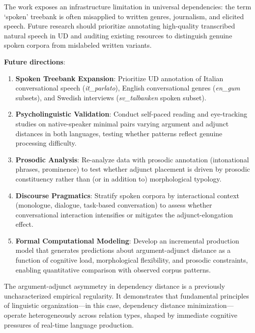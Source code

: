 \documentclass[11pt,letterpaper]{article}
\begin{document}
The work exposes an infrastructure limitation in universal dependencies: the term `spoken' treebank is often misapplied to written genres, journalism, and elicited speech. Future research should prioritize annotating high-quality transcribed natural speech in UD and auditing existing resources to distinguish genuine spoken corpora from mislabeled written variants.

\textbf{Future directions}:

\begin{enumerate}
  \item \textbf{Spoken Treebank Expansion}: Prioritize UD annotation of Italian conversational speech (\textit{it\_parlato}), English conversational genres (\textit{en\_gum} subsets), and Swedish interviews (\textit{sv\_talbanken} spoken subset).

  \item \textbf{Psycholinguistic Validation}: Conduct self-paced reading and eye-tracking studies on native-speaker minimal pairs varying argument and adjunct distances in both languages, testing whether patterns reflect genuine processing difficulty.

  \item \textbf{Prosodic Analysis}: Re-analyze data with prosodic annotation (intonational phrases, prominence) to test whether adjunct placement is driven by prosodic constituency rather than (or in addition to) morphological typology.

  \item \textbf{Discourse Pragmatics}: Stratify spoken corpora by interactional context (monologue, dialogue, task-based conversation) to assess whether conversational interaction intensifies or mitigates the adjunct-elongation effect.

  \item \textbf{Formal Computational Modeling}: Develop an incremental production model that generates predictions about argument-adjunct distance as a function of cognitive load, morphological flexibility, and prosodic constraints, enabling quantitative comparison with observed corpus patterns.
\end{enumerate}

The argument-adjunct asymmetry in dependency distance is a previously uncharacterized empirical regularity. It demonstrates that fundamental principles of linguistic organization---in this case, dependency distance minimization---operate heterogeneously across relation types, shaped by immediate cognitive pressures of real-time language production.



\end{document}
